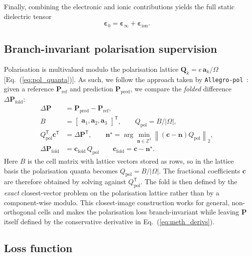 \documentclass[aps,physrev,graphicx,amsmath,amssymb,
               reprint,superscriptaddress]{revtex4-2}
\begin{document}
Finally, combining the electronic and ionic contributions yields the full static dielectric tensor
\begin{equation}
  \boldsymbol{\varepsilon}_0 = \boldsymbol{\varepsilon}_\infty + \boldsymbol{\varepsilon}_{\mathrm{ion}} .
\end{equation}

\subsection{Branch-invariant polarisation supervision}
\label{sec:pol-loss}

Polarisation is multivalued modulo the polarisation lattice
$\mathbf Q_k=e\,\mathbf a_k/\Omega$ [Eq.~(\ref{eq:pol_quanta})].
As such, we follow the approach taken by \texttt{Allegro-pol}~\cite{allegro-pol-2025}: given a reference $\mathbf P_\mathrm{ref}$ and prediction $\mathbf P_\mathrm{pred}$, we compare the \emph{folded} difference $\Delta\mathbf P_\mathrm{fold}$:
\begin{align}
\Delta\mathbf P &= \mathbf P_\mathrm{pred}-\mathbf P_\mathrm{ref},\nonumber\\
B &= 
\begin{bmatrix}
\mathbf a_1, 
\mathbf a_2,
\mathbf a_3
\end{bmatrix}^\mathsf{T},
\qquad
Q_\mathrm{pol}=B/|\Omega|,\nonumber\\
Q_\mathrm{pol}^{\mathsf T}\mathbf c^{\mathsf T} &= \Delta\mathbf P^{\mathsf T},
\qquad
\mathbf n^\star=\arg\min_{\mathbf n\in\mathbb Z^3}\left\|(\mathbf c-\mathbf n)Q_\mathrm{pol}\right\|_2,\nonumber\\
\Delta\mathbf P_\mathrm{fold} &= \mathbf c_\mathrm{fold}\,Q_\mathrm{pol} \qquad
\mathbf c_\mathrm{fold}=\mathbf c-\mathbf n^\star.
\label{eq:meth_fold}
\end{align}
Here $B$ is the cell matrix with lattice vectors stored as rows, so in the lattice basis the polarisation quanta becomes $Q_\mathrm{pol}=B/|\Omega|$. The fractional coefficients $\mathbf c$ are therefore obtained by solving against $Q_\mathrm{pol}^{\mathsf T}$. The fold is then defined by the \emph{exact} closest-vector problem on the polarisation lattice rather than by a component-wise modulo. This closest-image construction works for general, non-orthogonal cells and makes the polarisation loss branch-invariant while leaving $\mathbf P$ itself defined by the conservative derivative in Eq.~(\ref{eq:meth_derivs}).

\subsection{Loss function}
\end{document}
